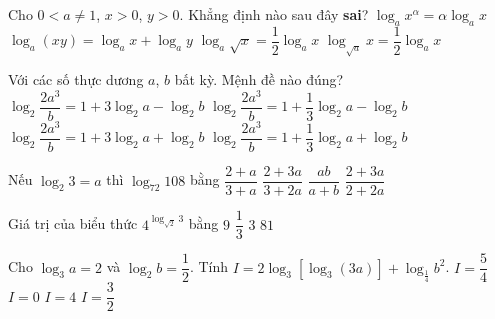 \begin{ex}%
	Cho $0<a\neq 1$, $x>0$, $y>0$. Khẳng định nào sau  đây \textbf{sai}?
	\choice 
		{$\log_a x^{\alpha}=\alpha\log_a  x$}
		{$\log_a(xy)=\log_a x+\log_a  y$}
		{$\log_a \sqrt{x}=\dfrac{1}{2}\log_a x$} 
		{\True  $\log_{\sqrt{a}}x=\dfrac{1}{2}\log_a x$}
\end{ex}

\begin{ex}%
	 Với các số thực dương $a$, $b$ bất kỳ. Mệnh đề nào đúng?
	\choice 
		 {\True $\log_2 \dfrac{2a^3}{b}=1+3\log_2 a-\log_2 b$}
		{$\log_2 \dfrac{2a^3}{b}=1+\dfrac{1}{3}  \log_2 a-\log_2 b$}
		{$\log_2 \dfrac{2a^3}{b}=1+3\log_2  a+\log_2 b$}
		{$\log_2 \dfrac{2a^3}{b}=1+\dfrac{1}{3}  \log_2 a+\log_2 b$}
\end{ex}

\begin{ex}%
	Nếu $\log_2 3=a$ thì $\log  _{72} 108$ bằng
	\choice 
		{$\dfrac{2+a}{3+a}$} 
		 {\True $\dfrac{2+3a}{3+2a}$}
		 {$\dfrac{ab}{a+b}$}
		{$\dfrac{2+3a}{2+2a}$} 
\end{ex}

\begin{ex}%
	Giá  trị của biểu thức $4^{\log _{\sqrt{2}} 3}$ bằng
	 \choice
		{$9$} 
		{$\dfrac{1}{3}$} 
		 {$3$}
		{\True $81$} 
\end{ex}

\begin{ex}%
	Cho $\log_3  a=2$ và $\log_2 b=\dfrac{1}{2}$. Tính $I=2\log_3 \left[\log_3 (3a)\right]+\log _{\tfrac{1}{4}} b^2$.
	 \choice
		{$I=\dfrac{5}{4}$} 
		{$I=0$} 
		{\True  $I=4$}
		 {$I=\dfrac{3}{2}$}
\end{ex}

